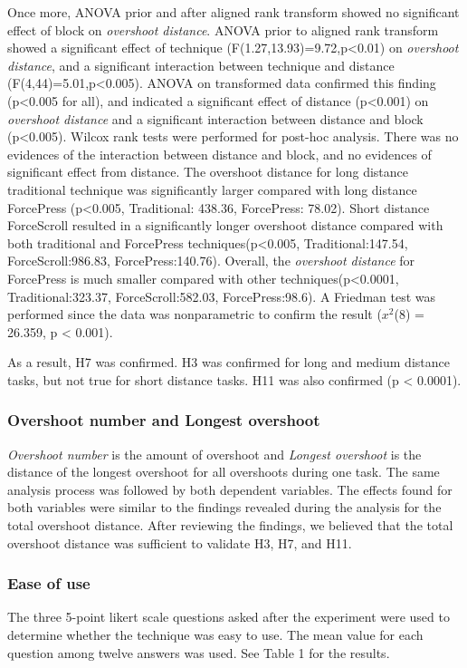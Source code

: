 \documentclass{sigchi}
\begin{document}
Once more, ANOVA prior and after aligned rank transform showed no significant effect of block on \textit{overshoot distance}. ANOVA prior to aligned rank transform showed a significant effect of technique (F(1.27,13.93)=9.72,p<0.01) on \textit{overshoot distance}, and a significant interaction between technique and distance (F(4,44)=5.01,p<0.005). ANOVA on transformed data confirmed this finding (p<0.005 for all), and indicated a significant effect of distance (p<0.001) on \textit{overshoot distance} and a significant interaction between distance and block (p<0.005). Wilcox rank tests were performed for post-hoc analysis. There was no evidences of the interaction between distance and block, and no evidences of significant effect from distance. The overshoot distance for long distance traditional technique was significantly larger compared with long distance ForcePress (p<0.005, Traditional: 438.36, ForcePress: 78.02). Short distance ForceScroll resulted in a significantly longer overshoot distance compared with both traditional and ForcePress techniques(p<0.005, Traditional:147.54, ForceScroll:986.83, ForcePress:140.76). Overall, the \textit{overshoot distance} for ForcePress is much smaller compared with other techniques(p<0.0001, Traditional:323.37, ForceScroll:582.03, ForcePress:98.6). A Friedman test was performed since the data was nonparametric to confirm the result ($x^{2}$(8) = 26.359, p < 0.001).

As a result, H7 was confirmed. H3 was confirmed for long and medium distance tasks, but not true for short distance tasks. H11 was also confirmed (p < 0.0001).  

\subsubsection{Overshoot number and Longest overshoot}
\textit{Overshoot number} is the amount of overshoot and \textit{Longest overshoot} is the distance of the longest overshoot for all overshoots during one task. The same analysis process was followed by both dependent variables. The effects found for both variables were similar to the findings revealed during the analysis for the total overshoot distance. After reviewing the findings, we believed that the total overshoot distance was sufficient to validate H3, H7, and H11.    

\subsubsection{Ease of use}
The three 5-point likert scale questions asked after the experiment were used to determine whether the technique was easy to use. The mean value for each question among twelve answers was used. See Table 1 for the results.
\end{document}
